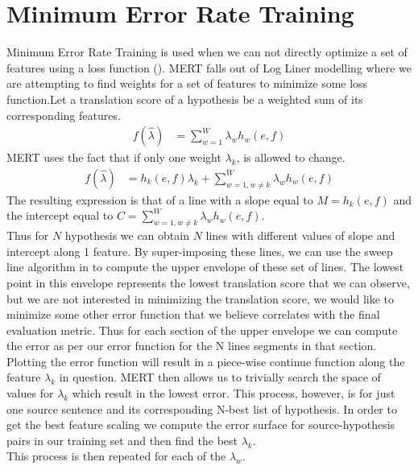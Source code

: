 \documentclass[11pt]{article}
\newcommand{\lam}{\lambda}
\begin{document}
\section{Minimum Error Rate Training}
Minimum Error Rate Training is used when we can not directly optimize a set of
features using a loss function (\cite{och2003minimum}). MERT falls out of Log
Liner modelling where we are attempting to find weights for a set of features to minimize some loss
function.Let a translation score of a hypothesis be a weighted sum of its
corresponding features.
\begin{align*}
f(\hat{\lam}) &= \sum_{w=1}^W \lam_w h_w(e,f)
\end{align*}
MERT uses the fact that if only one weight $\lam_k$, is allowed to
change.
\begin{align*}
f(\hat{\lam}) &= h_k(e,f)\lam_k + \sum_{w=1,w \neq k}^W \lam_wh_w(e,f)
\end{align*} 
The resulting expression is that of a line with a slope equal to
$M = h_k(e,f)$ and the intercept equal to $C = \sum_{w=1,w \neq k}^W \lam_w
h_w(e,f)$.\\
Thus for $N$ hypothesis we can obtain $N$ lines with different values
of slope and intercept along 1 feature. By super-imposing these lines, we can
use the sweep line algorithm in \cite{macherey2008lattice} to compute the upper
envelope of these set of lines. The lowest point in this envelope represents the
lowest translation score that we can observe, but we are not interested in
minimizing the translation score, we would like to minimize some other error
function that we believe correlates with the final evaluation metric. Thus for
each section of the upper envelope we can compute the error as per our error
function for the N lines segments in that section. Plotting the error function
will result in a piece-wise continue function along the feature $\lam_k$ in
question. MERT then allows us to trivially search the space of values for
$\lam_k$ which result in the lowest error. This process, however, is for just
one source sentence and its corresponding N-best list of hypothesis. In order to
get the best feature scaling we compute the error surface for source-hypothesis
pairs in our training set and then find the best $\lam_k$.\\ This process is
then repeated for each of the $\lam_w$.
\end{document}
